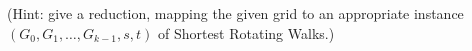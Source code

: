 \documentclass[11pt]{article}
\begin{document}
\begin{enumerate}
\begin{enumerate}
        (Hint: give a reduction, mapping the given grid to an appropriate instance $(G_0,G_1,\ldots,G_{k-1},s,t)$ of Shortest Rotating Walks.)

 \end{enumerate}
 
\end{enumerate}
\end{document}
